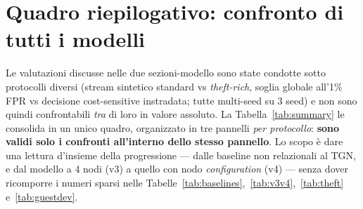 \documentclass[11pt,a4paper]{report}
\begin{document}
\clearpage
\section{Quadro riepilogativo: confronto di tutti i modelli}
\label{sec:summary}

Le valutazioni discusse nelle due sezioni-modello sono state condotte sotto protocolli diversi (stream sintetico standard vs \emph{theft-rich}, soglia globale all'1\% FPR vs decisione cost-sensitive instradata; tutte multi-seed su 3 seed) e non sono quindi confrontabili \emph{tra} di loro in valore assoluto. La Tabella~\ref{tab:summary} le consolida in un unico quadro, organizzato in tre pannelli \emph{per protocollo}: \textbf{sono validi solo i confronti all'interno dello stesso pannello}. Lo scopo è dare una lettura d'insieme della progressione --- dalle baseline non relazionali al TGN, e dal modello a 4 nodi (v3) a quello con nodo \textit{configuration} (v4) --- senza dover ricomporre i numeri sparsi nelle Tabelle~\ref{tab:baselines},~\ref{tab:v3v4},~\ref{tab:theft} e~\ref{tab:guestdev}.
\end{document}

